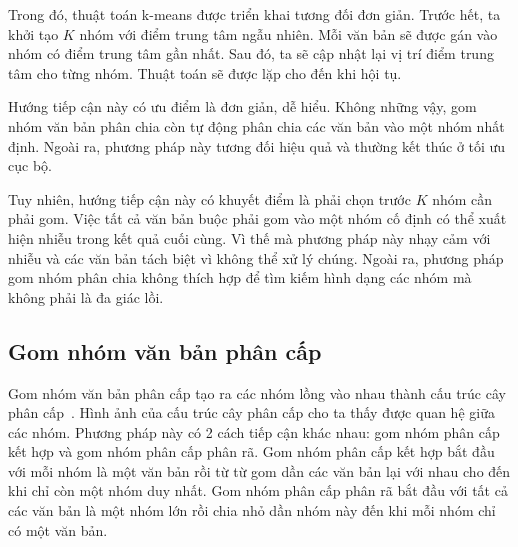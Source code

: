 Trong đó, thuật toán k-means được triển khai tương đối đơn giản.
Trước hết, ta khởi tạo $K$ nhóm với điểm trung tâm ngẫu nhiên.
Mỗi văn bản sẽ được gán vào nhóm có điểm trung tâm gần nhất.
Sau đó, ta sẽ cập nhật lại vị trí điểm trung tâm cho từng nhóm.
Thuật toán sẽ được lặp cho đến khi hội tụ.

Hướng tiếp cận này có ưu điểm là đơn giản, dễ hiểu.
Không những vậy, gom nhóm văn bản phân chia còn tự động phân chia các văn bản vào một nhóm nhất định.
Ngoài ra, phương pháp này tương đối hiệu quả và thường kết thúc ở tối ưu cục bộ.

Tuy nhiên, hướng tiếp cận này có khuyết điểm là phải chọn trước $K$ nhóm cần phải gom.
Việc tất cả văn bản buộc phải gom vào một nhóm cố định có thể xuất hiện nhiễu trong kết quả cuối cùng.
Vì thế mà phương pháp này nhạy cảm với nhiễu và các văn bản tách biệt vì không thể xử lý chúng.
Ngoài ra, phương pháp gom nhóm phân chia không thích hợp để tìm kiếm hình dạng các nhóm mà không phải là đa giác lồi.

%

\subsection{Gom nhóm văn bản phân cấp}
\label{sec:gnvbpc}
Gom nhóm văn bản phân cấp tạo ra các nhóm lồng vào nhau thành cấu trúc cây phân cấp~\cite{hierarchical-clustering}.
Hình ảnh của cấu trúc cây phân cấp cho ta thấy được quan hệ giữa các nhóm.
Phương pháp này có 2 cách tiếp cận khác nhau: gom nhóm phân cấp kết hợp và gom nhóm phân cấp phân rã.
Gom nhóm phân cấp kết hợp bắt đầu với mỗi nhóm là một văn bản rồi từ từ gom dần các văn bản lại với nhau cho đến khi chỉ còn một nhóm duy nhất.
Gom nhóm phân cấp phân rã bắt đầu với tất cả các văn bản là một nhóm lớn rồi chia nhỏ dần nhóm này đến khi mỗi nhóm chỉ có một văn bản.

